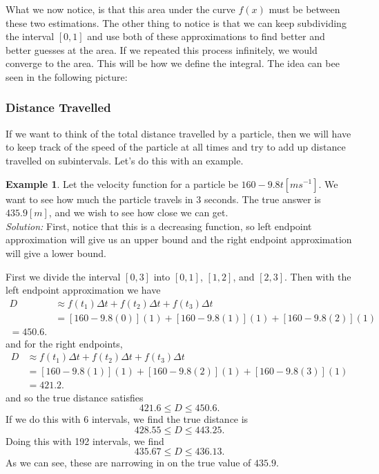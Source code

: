 \documentclass[leqno]{article}
\theoremstyle{definition}
\newtheorem{example}{Example}[section]
\theoremstyle{remark}
\theoremstyle{theorem}
\begin{document}
What we now notice, is that this area under the curve $f(x)$ must be between these two estimations. The other thing to notice is that we can keep subdividing the interval $[0,1]$ and use both of these approximations to find better and better guesses at the area. If we repeated this process infinitely, we would converge to the area. This will be how we define the integral. The idea can bee seen in the following picture:
\vspace*{5cm}\\



\subsubsection{Distance Travelled}

If we want to think of the total distance travelled by a particle, then we will have to keep track of the speed of the particle at all times and try to add up distance travelled on subintervals. Let's do this with an example.

\begin{example}
Let the velocity function for a particle be $160-9.8t [ms^{-1}]$. We want to see how much the particle travels in $3$ seconds. The true answer is $435.9[m]$, and we wish to see how close we can get.\\
\noindent \emph{Solution:} First, notice that this is a decreasing function, so left endpoint approximation will give us an upper bound and the right endpoint approximation will give a lower bound. 

First we divide the interval $[0,3]$ into $[0,1]$, $[1,2]$, and $[2,3]$.  Then with the left endpoint approximation we have
\begin{align*}
D&\approx f(t_1) \Delta t + f(t_2)\Delta t + f(t_3) \Delta t\\
&= [160-9.8(0)](1)+[160-9.8(1)](1)+[160-9.8(2)](1)\\
=450.6.
\end{align*}
and for the right endpoints,
\begin{align*}
D &\approx f(t_1)\Delta t + f(t_2) \Delta t + f(t_3) \Delta t\\
&= [160-9.8(1)](1)+[160-9.8(2)](1)+[160-9.8(3)](1)\\
&= 421.2.
\end{align*}
and so the true distance satisfies
\[
421.6\leq D \leq 450.6.
\]
If we do this with 6 intervals, we find the true distance is 
\[
428.55 \leq D \leq 443.25.
\]
Doing this with 192 intervals, we find
\[
435.67\leq D \leq 436.13.
\]
As we can see, these are narrowing in on the true value of $435.9$.
\end{example}
\end{document}

